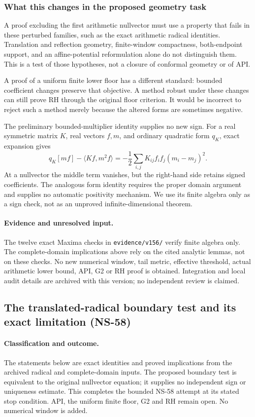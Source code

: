 \documentclass[11pt]{article}
\theoremstyle{remark}
\begin{document}
\subsubsection{What this changes in the proposed geometry task}
A proof excluding the first arithmetic nullvector must use a property
that fails in these perturbed families, such as the exact arithmetic
radical identities. Translation and reflection geometry, finite-window
compactness, both-endpoint support, and an affine-potential reformulation
alone do not distinguish them. This is a test of those hypotheses,
not a closure of conformal geometry or of API.

A proof of a uniform finite lower floor has a different standard:
bounded coefficient changes preserve that objective. A method robust
under these changes can still prove RH through the original floor
criterion. It would be incorrect to reject such a method merely
because the altered forms are sometimes negative.

The preliminary bounded-multiplier identity supplies no new sign.
For a real symmetric matrix $K$, real vectors $f,m$, and ordinary
quadratic form $q_K$, exact expansion gives
\[
 q_K[mf]-\langle Kf,m^2f\rangle
 =-\frac12\sum_{i,j}K_{ij}f_if_j(m_i-m_j)^2.
\]
At a nullvector the middle term vanishes, but the right-hand side
retains signed coefficients. The analogous form identity requires
the proper domain argument and supplies no automatic positivity
mechanism. We use its finite algebra only as a sign check, not as
an unproved infinite-dimensional theorem.


\paragraph{Evidence and unresolved input.}
The twelve exact Maxima checks in \texttt{evidence/v156/} verify finite
algebra only. The complete-domain implications above rely on the cited
analytic lemmas, not on these checks. No new numerical window, tail metric,
effective threshold, actual arithmetic lower bound, API, G2 or RH proof is
obtained. Integration and local audit details are archived with this version;
no independent review is claimed.

\subsection{The translated-radical boundary test and its exact limitation (NS-58)}
\label{sec:ns58-boundary}

\paragraph{Classification and outcome.}
The statements below are exact identities and proved implications from
the archived radical and complete-domain inputs. The proposed boundary
test is equivalent to the original nullvector equation; it supplies no
independent sign or uniqueness estimate. This completes the bounded
NS-58 attempt at its stated stop condition. API, the uniform finite
floor, G2 and RH remain open. No numerical window is added.
\end{document}
